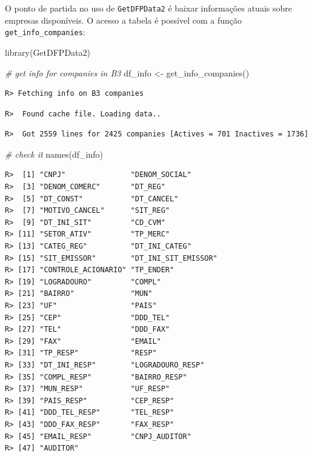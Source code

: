 \documentclass[
  11pt,
]{book}
\newenvironment{Shaded}{\begin{snugshade}}{\end{snugshade}}
\newcommand{\CommentTok}[1]{\textcolor[rgb]{0.37,0.37,0.37}{\textit{#1}}}
\newcommand{\FunctionTok}[1]{\textcolor[rgb]{0,0,0}{#1}}
\newcommand{\NormalTok}[1]{#1}
\newcommand{\OtherTok}[1]{\textcolor[rgb]{0.37,0.37,0.37}{#1}}
\begin{document}
O ponto de partida no uso de \texttt{GetDFPData2} é baixar informações atuais sobre empresas disponíveis. O acesso a tabela é possível com a função \texttt{get\_info\_companies}:  

\begin{Shaded}
\begin{Highlighting}[]
\FunctionTok{library}\NormalTok{(GetDFPData2)}

\CommentTok{\# get info for companies in B3}
\NormalTok{df\_info }\OtherTok{\textless{}{-}} \FunctionTok{get\_info\_companies}\NormalTok{()}
\end{Highlighting}
\end{Shaded}

\begin{verbatim}
R> Fetching info on B3 companies
\end{verbatim}

\begin{verbatim}
R>  Found cache file. Loading data..
\end{verbatim}

\begin{verbatim}
R>  Got 2559 lines for 2425 companies [Actives = 701 Inactives = 1736]
\end{verbatim}

\begin{Shaded}
\begin{Highlighting}[]
\CommentTok{\# check it}
\FunctionTok{names}\NormalTok{(df\_info)}
\end{Highlighting}
\end{Shaded}

\begin{verbatim}
R>  [1] "CNPJ"               "DENOM_SOCIAL"      
R>  [3] "DENOM_COMERC"       "DT_REG"            
R>  [5] "DT_CONST"           "DT_CANCEL"         
R>  [7] "MOTIVO_CANCEL"      "SIT_REG"           
R>  [9] "DT_INI_SIT"         "CD_CVM"            
R> [11] "SETOR_ATIV"         "TP_MERC"           
R> [13] "CATEG_REG"          "DT_INI_CATEG"      
R> [15] "SIT_EMISSOR"        "DT_INI_SIT_EMISSOR"
R> [17] "CONTROLE_ACIONARIO" "TP_ENDER"          
R> [19] "LOGRADOURO"         "COMPL"             
R> [21] "BAIRRO"             "MUN"               
R> [23] "UF"                 "PAIS"              
R> [25] "CEP"                "DDD_TEL"           
R> [27] "TEL"                "DDD_FAX"           
R> [29] "FAX"                "EMAIL"             
R> [31] "TP_RESP"            "RESP"              
R> [33] "DT_INI_RESP"        "LOGRADOURO_RESP"   
R> [35] "COMPL_RESP"         "BAIRRO_RESP"       
R> [37] "MUN_RESP"           "UF_RESP"           
R> [39] "PAIS_RESP"          "CEP_RESP"          
R> [41] "DDD_TEL_RESP"       "TEL_RESP"          
R> [43] "DDD_FAX_RESP"       "FAX_RESP"          
R> [45] "EMAIL_RESP"         "CNPJ_AUDITOR"      
R> [47] "AUDITOR"
\end{verbatim}
\end{document}
